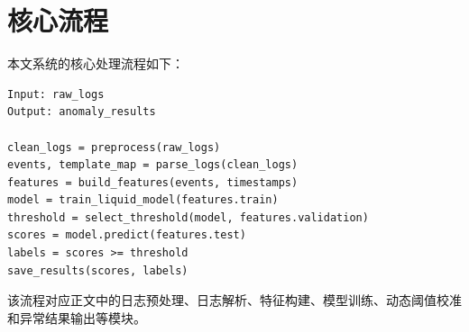 \chapter{核心流程}

本文系统的核心处理流程如下：

\begin{lstlisting}
Input: raw_logs
Output: anomaly_results

clean_logs = preprocess(raw_logs)
events, template_map = parse_logs(clean_logs)
features = build_features(events, timestamps)
model = train_liquid_model(features.train)
threshold = select_threshold(model, features.validation)
scores = model.predict(features.test)
labels = scores >= threshold
save_results(scores, labels)
\end{lstlisting}

该流程对应正文中的日志预处理、日志解析、特征构建、模型训练、动态阈值校准和异常结果输出等模块。

